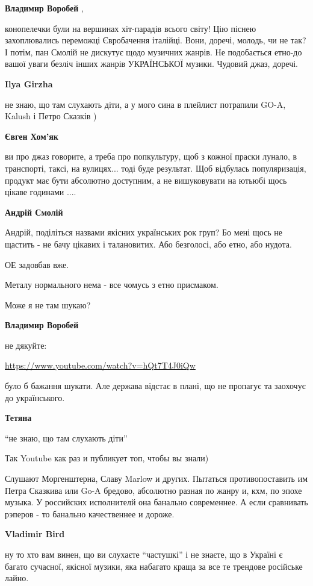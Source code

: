 \begin{itemize}
\begin{itemize}
\textbf{Владимир Воробей} , 

конопелечки були на вершинах хіт-парадів всього світу! Цію піснею захоплювались
переможці Євробачення італійці. Вони, доречі, молодь, чи не так? І потім, пан
Смолій не дискутує щодо музичних жанрів. Не подобається етно-до вашої уваги
безліч інших жанрів УКРАЇНСЬКОЇ музики. Чудовий джаз, доречі.


\textbf{Ilya Girzha} 

не знаю, що там слухають діти, а у мого сина в плейлист потрапили GO-A, Kalush
і Петро Сказків )


\textbf{Євген Хом'як} 

ви про джаз говорите, а треба про попкультуру, щоб з кожної праски лунало, в
транспорті, таксі, на вулицях... тоді буде результат. Щоб відбулась
популяризація, продукт має бути абсолютно доступним, а не вишуковувати на
ютьюбі щось цікаве годинами ....

\textbf{Андрій Смолій} 

Андрій, поділіться назвами якісних українських рок груп? Бо мені щось не
щастить - не бачу цікавих і талановитих. Або безголосі, або етно, або нудота.

ОЕ задовбав вже.

Металу нормального нема - все чомусь з етно присмаком.

Може я не там шукаю?

\textbf{Владимир Воробей} 

не дякуйте:

\url{https://www.youtube.com/watch?v=hQt7T4J0iQw}

було б бажання шукати. Але держава відстає в плані, що не пропагує та заохочує
до українського.

\textbf{Тетяна} 

\enquote{не знаю, що там слухають діти}

Так Youtube как раз и публикует топ, чтобы вы знали)

Слушают Моргенштерна, Славу Marlow и других. Пытаться противопоставить им Петра
Сказкива или Go-A бредово, абсолютно разная по жанру и, кхм, по эпохе музыка. У
российских исполнителй она банально современнее. А если сравнивать рэперов - то
банально качественнее и дороже.

\textbf{Vladimir Bird} 

ну то хто вам винен, що ви слухаєте \enquote{частушкі} і не знаєте, що в Україні є
багато сучасної, якісної музики, яка набагато краща за все те трендове
російське лайно.


\end{itemize}
\end{itemize}
